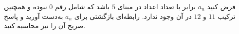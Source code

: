     \p 
فرض کنید
$a_n$
برابر با تعداد اعداد در مبنای
$5$
باشد که شامل رقم
$0$
نبوده و همچنین ترکیب
$11$
و
$12$
در آن‌ وجود ندارد. رابطه‌ای بازگشتی برای
$a_n$
به‌دست آورید و پاسخ صریح آن را نیز محاسبه کنید.